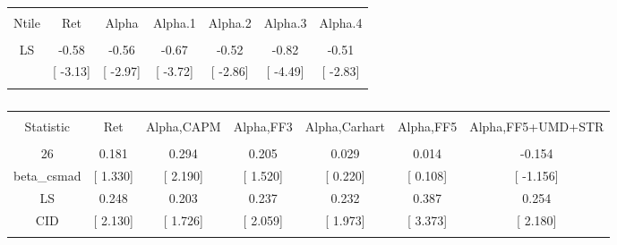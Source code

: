 \documentclass[16pt]{article}
\begin{document}
\begin{table}[!htbp] \centering 
  \caption{} 
  \label{} 
\begin{tabular}{@{\extracolsep{5pt}} ccccccc} 
\\[-1.8ex]\hline 
\hline \\[-1.8ex] 
Ntile & Ret & Alpha & Alpha.1 & Alpha.2 & Alpha.3 & Alpha.4 \\ 
\hline \\[-1.8ex] 
LS & -0.58 & -0.56 & -0.67 & -0.52 & -0.82 & -0.51 \\ 
 & [ -3.13] & [ -2.97] & [ -3.72] & [ -2.86] & [ -4.49] & [ -2.83] \\ 
\hline \\[-1.8ex] 
\end{tabular} 
\end{table}

\begin{table}[!htbp] \centering 
  \caption{} 
  \label{} 
\begin{tabular}{@{\extracolsep{5pt}} ccccccc} 
\\[-1.8ex]\hline 
\hline \\[-1.8ex] 
Statistic & Ret & Alpha,CAPM & Alpha,FF3 & Alpha,Carhart & Alpha,FF5 & Alpha,FF5+UMD+STR \\ 
\hline \\[-1.8ex] 
26 & 0.181 & 0.294 & 0.205 & 0.029 & 0.014 & -0.154 \\ 
beta\_csmad & [ 1.330] & [ 2.190] & [ 1.520] & [ 0.220] & [ 0.108] & [ -1.156] \\ 
LS & 0.248 & 0.203 & 0.237 & 0.232 & 0.387 & 0.254 \\ 
CID & [ 2.130] & [ 1.726] & [ 2.059] & [ 1.973] & [ 3.373] & [ 2.180] \\ 
\hline \\[-1.8ex] 
\end{tabular} 
\end{table}
\end{document}
